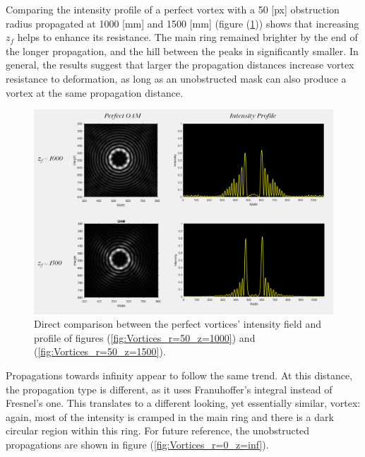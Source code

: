Comparing the intensity profile of a perfect vortex with a 50 [px] obstruction radius propagated at 1000 [mm] and 1500 [mm] (figure (\ref{fig:perfects_1000_vs_1500})) shows that increasing $z_f$ helps to enhance its resistance. The main ring remained brighter by the end of the longer propagation, and the hill between the peaks in significantly smaller. In general, the results suggest that larger the propagation distances increase vortex resistance to deformation, as long as an unobstructed mask can also produce a vortex at the same propagation distance. 

\begin{figure}[htbp]
    \centering
    \includegraphics[width=\textwidth]{images/c04/Different_zf_same_obs.png}
    \caption{Direct comparison between the perfect vortices' intensity field and profile of figures (\ref{fig:Vortices_r=50_z=1000}) and (\ref{fig:Vortices_r=50_z=1500}).}
    \label{fig:perfects_1000_vs_1500}
\end{figure}

Propagations towards infinity appear to follow the same trend. At this distance, the propagation type is different, as it uses Franuhoffer's integral instead of Fresnel's one. This translates to a different looking, yet essentially similar, vortex: again, most of the intensity is cramped in the main ring and there is a dark circular region within this ring. For future reference, the unobstructed propagations are shown in figure (\ref{fig:Vortices_r=0_z=inf}).

